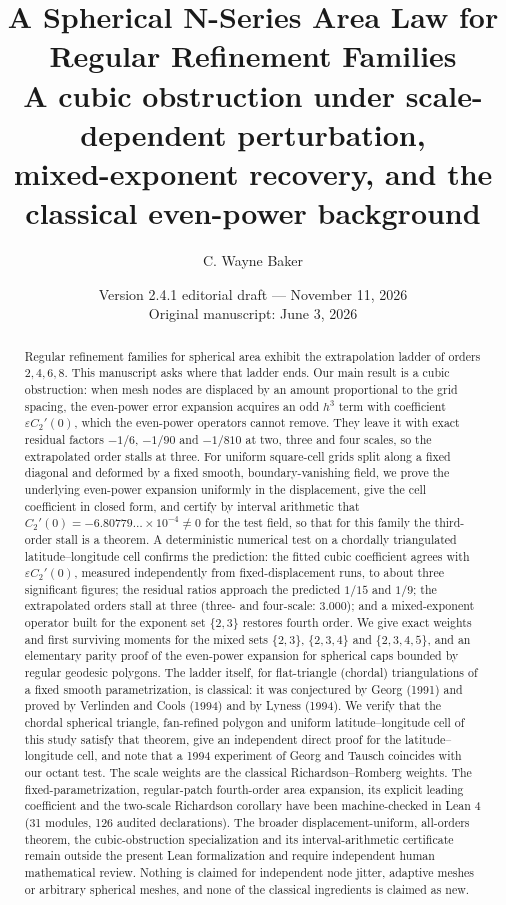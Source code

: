 \documentclass[11pt]{article}
\title{A Spherical N-Series Area Law for Regular Refinement Families\\[2pt]
\large A cubic obstruction under scale-dependent perturbation,\\
mixed-exponent recovery, and the classical even-power background}
\author{C. Wayne Baker}
\date{Version 2.4.1 editorial draft --- November 11, 2026\\ Original manuscript: June 3, 2026}
\theoremstyle{remark}
\begin{document}
\maketitle

\begin{abstract}
Regular refinement families for spherical area exhibit the extrapolation ladder of orders
$2,4,6,8$. This manuscript asks where that ladder ends. Our main result is a cubic
obstruction: when mesh nodes are displaced by an amount proportional to the grid spacing, the
even-power error expansion acquires an odd $h^3$ term with coefficient $\varepsilon C_2'(0)$,
which the even-power operators cannot remove. They leave it with exact residual factors
$-1/6$, $-1/90$ and $-1/810$ at two, three and four scales, so the extrapolated order stalls
at three. For uniform square-cell grids split along a fixed diagonal and deformed by a fixed
smooth, boundary-vanishing field, we prove the underlying even-power expansion uniformly in
the displacement, give the cell coefficient in closed form, and certify by interval
arithmetic that $C_2'(0)=-6.80779\ldots\times10^{-4}\neq0$ for the test field, so that for this
family the third-order stall is a theorem. A deterministic numerical test on a chordally triangulated latitude--longitude cell
confirms the prediction: the fitted cubic coefficient agrees with $\varepsilon C_2'(0)$,
measured independently from fixed-displacement runs, to about three significant figures; the
residual ratios approach the predicted $1/15$ and $1/9$; the extrapolated orders stall at
three (three- and four-scale: $3.000$); and a mixed-exponent operator built for the exponent set $\{2,3\}$ restores fourth
order. We give exact weights and first surviving moments for the mixed sets $\{2,3\}$,
$\{2,3,4\}$ and $\{2,3,4,5\}$, and an elementary parity proof of the even-power expansion for
spherical caps bounded by regular geodesic polygons. The ladder itself, for flat-triangle
(chordal) triangulations of a fixed smooth parametrization, is classical: it was conjectured
by Georg (1991) and proved by Verlinden and Cools (1994) and by Lyness (1994). We verify that
the chordal spherical triangle, fan-refined polygon and uniform latitude--longitude cell of
this study satisfy that theorem, give an independent direct proof for the latitude--longitude
cell, and note that a 1994 experiment of Georg and Tausch coincides with our octant test. The
scale weights are the classical Richardson--Romberg weights. The fixed-parametrization, regular-patch fourth-order area expansion, its explicit leading
coefficient and the two-scale Richardson corollary have been machine-checked in Lean 4 (31
modules, 126 audited declarations). The broader displacement-uniform, all-orders theorem,
the cubic-obstruction specialization and its interval-arithmetic certificate remain outside
the present Lean formalization and require independent human mathematical review. Nothing is claimed for independent node jitter, adaptive meshes or arbitrary
spherical meshes, and none of the classical ingredients is claimed as new.
\end{abstract}
\end{document}
